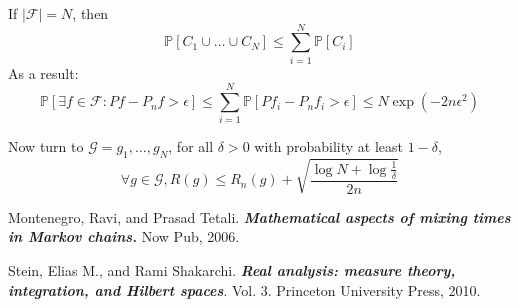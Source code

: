 \documentclass[12pt,reqno]{amsart}
\begin{document}
If $|\mathcal{F}| = N$, then
$$
	\mathbb{P}[C_1\cup \ldots \cup C_N] \leq \sum_{i=1}^N \mathbb{P}[C_i]
$$
As a result:
$$
	\mathbb{P}[\exists f\in \mathcal{F}: Pf-P_nf > \epsilon] \leq \sum_{i=1}^N \mathbb{P}[Pf_i-P_nf_i>\epsilon] \leq N \exp (-2n\epsilon^2)
$$

Now turn to $\mathcal{G} = {g_1,\ldots, g_N}$, for all $\delta > 0$ with probability at least $1-\delta$,
$$
	\forall g \in \mathcal{G}, R(g) \leq R_n(g) + \sqrt{\frac{\log N + \log\frac{1}{\delta}}{2n}}
$$


\begin{thebibliography}{99} %

Montenegro, Ravi, and Prasad Tetali. \textbf{\emph{Mathematical aspects of mixing times in Markov chains.}} Now Pub, 2006.

Stein, Elias M., and Rami Shakarchi. \textbf{\emph{Real analysis: measure theory, integration, and Hilbert spaces}}. Vol. 3. Princeton University Press, 2010.

\end{thebibliography}
\end{document}
